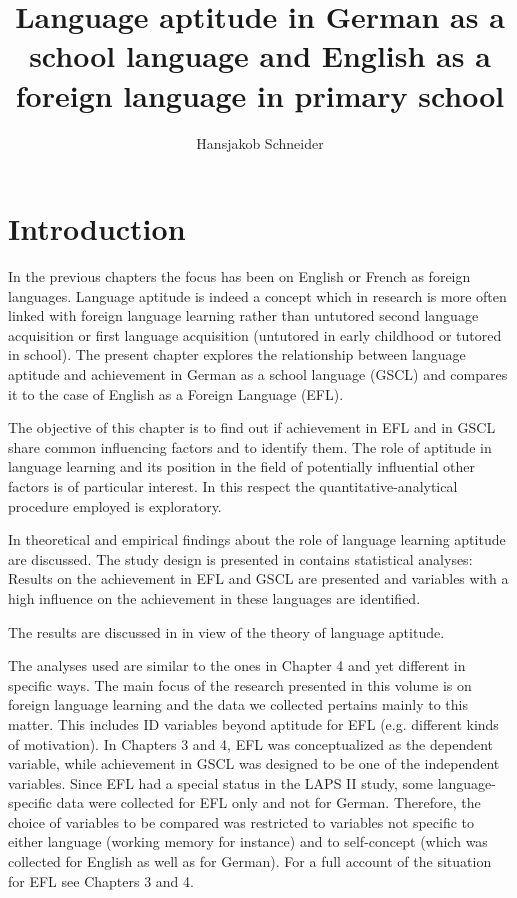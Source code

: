 \documentclass[output=paper]{langsci/langscibook}
\author{Hansjakob Schneider\affiliation{Zurich University of Teacher Education}\orcid{}}
\title[Language aptitude in German and English in primary school]
      {Language aptitude in German as a school language and English as a foreign language in primary school}
\begin{document}
\maketitle 


\section{Introduction}

In the previous chapters the focus has been on English or French as foreign languages. Language aptitude is indeed a concept which in research is more often linked with foreign language learning rather than untutored second language acquisition or first language acquisition (untutored in early childhood or tutored in school). The present chapter explores the relationship between language aptitude and achievement in German as a school language (GSCL) and compares it to the case of English as a Foreign Language (EFL).

The objective of this chapter is to find out if achievement in EFL and in GSCL share common influencing factors and to identify them. The role of aptitude in language learning and its position in the field of potentially influential other factors is of particular interest. In this respect the quantitative-analytical procedure employed is exploratory. 

In  theoretical and empirical findings about the role of language learning aptitude are discussed. The study design is presented in   contains statistical analyses: Results on the achievement in EFL and GSCL are presented and variables with a high influence on the achievement in these languages are identified. 

The results are discussed in  in view of the theory of language aptitude.

The analyses used are similar to the ones in Chapter 4 and yet different in specific ways. The main focus of the research presented in this volume is on foreign language learning and the data we collected pertains mainly to this matter. This includes ID variables beyond aptitude for EFL (e.g. different kinds of motivation). In Chapters 3 and 4, EFL was conceptualized as the dependent variable, while achievement in GSCL was designed to be one of the independent variables. Since EFL had a special status in the LAPS II study, some language-specific data were collected for EFL only and not for German. Therefore, the choice of variables to be compared was restricted to variables not specific to either language (working memory for instance) and to self-concept (which was collected for English as well as for German). For a full account of the situation for EFL see Chapters 3 and 4.
\end{document}
